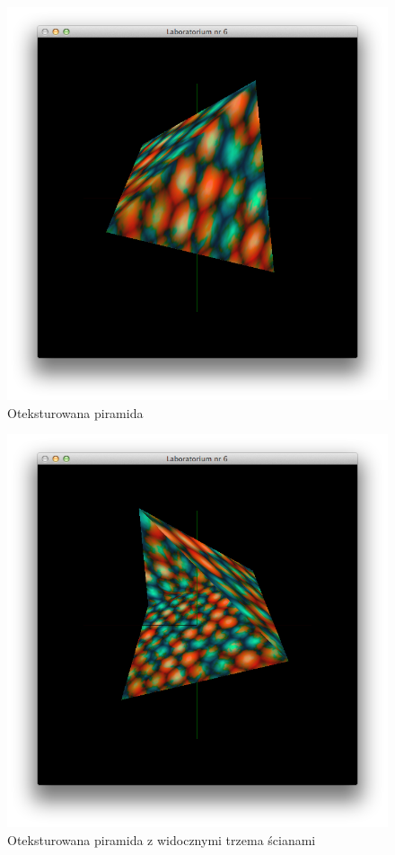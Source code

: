 \documentclass[wide,a4paper,titlepage,12pt] {article}
\begin{document}
  \begin{figure}[h!]
    \begin{center}
      \includegraphics[width=\textwidth]{1.png}
      \caption{Oteksturowana piramida}
    \end{center}
  \end{figure}

  \begin{figure}[h!]
    \begin{center}
      \includegraphics[width=\textwidth]{2.png}
      \caption{Oteksturowana piramida z widocznymi trzema ścianami}
    \end{center}
  \end{figure}
\end{document}
